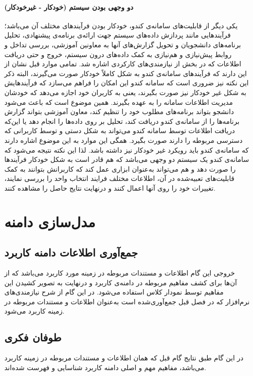 \documentclass{report}
\begin{document}
\subsubsection{دو وجهی بودن سیستم (خودکار - غیرخودکار) }
یکی دیگر از قابلیت‌های سامانه‌ی کندو، خودکار بودن فرآیندهای مختلف آن می‌باشد؛ فرآیندهایی مانند پردازش داده‌های سیستم جهت ارائه‌ی برنامه‌ی پیشنهادی، تحلیل برنامه‌های دانشجویان و تحویل گزارش‌های آنها به معاونین آموزشی، بررسی تداخل و روابط پیش‌نیازی و هم‌نیازی به کمک داده‌های درون سیستم، خروج و حتی دریافت اطلاعات که در بخش
\hyperlink{oo}{\underline{}} 
از نیازمندی‌های کارکردی اشاره شد. تمامی موارد قبل نشان از این دارند که فرآیندهای سامانه‌ی کندو به شکل کاملاً خودکار صورت می‌گیرند، البته ذکر این نکته نیز ضروری است که سامانه کندو این امکان را فراهم می‌سازد که فرآیندهایش به شکل غیر خودکار نیز صورت بگیرند، یعنی به کاربران خود اجازه می‌دهد که خودشان مدیریت اطلاعات سامانه را به عهده بگیرند. همین موضوع است که باعث می‌شود دانشجو بتواند برنامه‌های مطلوب خود را تنظیم کند، معاون آموزشی بتواند گزارش برنامه‌ها را  از سامانه‌ی کندو دریافت کند، تحلیل بر روی داده‌ها را انجام دهد  یا این‌که دریافت اطلاعات توسط سامانه  کندو می‌تواند به شکل دستی و توسط کاربرانی که دسترسی مربوطه را دارند صورت بگیرد. همگی این موارد به این موضوع اشاره دارند که سامانه‌ی کندو باید رویکرد غیر خودکار نیز داشته باشد.
لذا این نکته نتیجه می‌شود که سامانه‌ی کندو یک سیستم دو وجهی می‌باشد که هم قادر است به شکل خودکار فرآیندها را صورت دهد و هم می‌تواند به‌عنوان ابزاری عمل کند که کاربرانش بتوانند به کمک قابلیت‌های تعبیه‌شده در آن، اطلاعات مختلف فرایند انتخاب واحد را بررسی نمایند، تغییرات خود را روی آنها اعمال کنند و درنهایت نتایج حاصل را مشاهده کنند.

\clearpage

\chapter{مدل‌سازی دامنه}
\section{جمع‌آوری اطلاعات دامنه کاربرد}
خروجی این گام اطلاعات و مستندات مربوطه در زمینه مورد کاربرد می‌باشد که از آن‌ها برای کشف مفاهیم مربوطه در دامنه‌ی کاربرد و درنهایت به تصویر کشیدن این مفاهیم توسط نمودار کلاس استفاده می‌شود. در این گام از شرح نیازمندی‌های نرم‌افزار که در فصل قبل جمع‌آوری‌شده است به‌عنوان اطلاعات و مستندات مربوطه در زمینه کاربرد می‌شود.
\section{طوفان فکری}
در این گام طبق نتایج گام قبل که همان اطلاعات و مستندات مربوطه در زمینه کاربرد می‌باشد، مفاهیم مهم و اصلی دامنه کاربرد شناسایی و فهرست شده‌اند.
\end{document}
